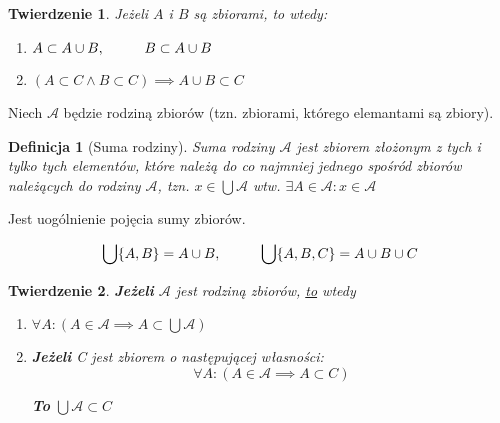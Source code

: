 \documentclass[a5paper,8pt]{article}
\theoremstyle{mythmstyle}
\newtheorem{definition}{Definicja}[section]
\newtheorem{theorem}{Twierdzenie}[section]
\newcommand\tab[1][1cm]{\hspace*{#1}}
\begin{document}
        \begin{theorem}
            Jeżeli $A$ i $B$ są zbiorami, to wtedy:

            \begin{enumerate}
                \item $ A \subset A \cup B, \tab B \subset A \cup B $

                \item $ ( A \subset C \wedge B \subset C ) \implies A \cup B \subset C $
            \end{enumerate}
        \end{theorem}

        Niech $ \mathcal{A} $ będzie rodziną zbiorów (tzn. zbiorami, którego elemantami są zbiory).

        \begin{definition}[Suma rodziny]
            Suma rodziny $ \mathcal{A} $ jest zbiorem złożonym z tych i tylko tych elementów, które należą do co najmniej jednego spośród zbiorów należących do rodziny $ \mathcal{A} $, tzn. $ x \in \bigcup \mathcal{A} $ wtw. $ \exists A \in \mathcal{A} : x \in \mathcal{A} $
        \end{definition}

        Jest uogólnienie pojęcia sumy zbiorów.

        \begin{equation*}
            \bigcup \{ A, B \} = A \cup B, \tab \bigcup \{ A, B, C \} = A \cup B \cup C
        \end{equation*}

        \pagebreak
        \begin{theorem}
            \textbf{Jeżeli} $ \mathcal{A} $ jest rodziną zbiorów, \underline{to} wtedy

            \begin{enumerate}
                \item $ \forall A : ( A \in \mathcal{A} \implies A \subset \bigcup \mathcal{A} ) $

                \item \textbf{Jeżeli} C jest zbiorem o następującej własności:
                    \begin{equation*}
                        \forall A : ( A \in \mathcal{A} \implies A \subset C )
                    \end{equation*}

                    \textbf{To} \tab $ \bigcup \mathcal{A} \subset C $
            \end{enumerate}
        \end{theorem}
\end{document}
